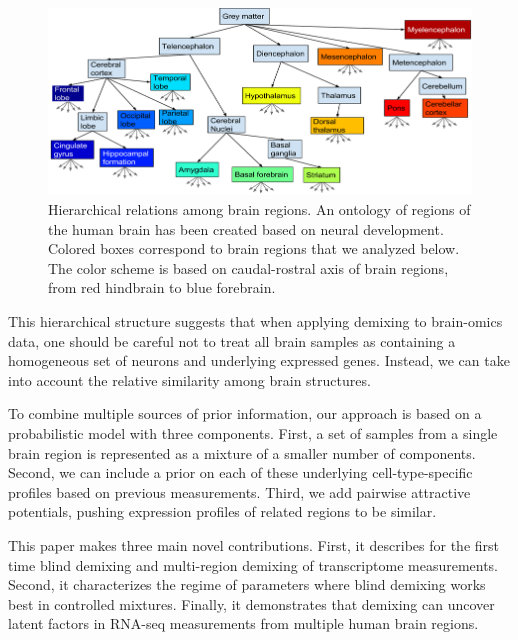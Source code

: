 \documentclass{article} %
\begin{document}
\begin{figure}[!hbt]
  \begin{minipage}[c]{0.63\textwidth}
    \includegraphics[width=\textwidth]{tree}
  \end{minipage}\hfill
  \begin{minipage}[c]{0.35\textwidth}
    \caption{Hierarchical relations among brain regions. An ontology of regions of the human brain has been created based on neural development. Colored boxes correspond to brain regions that we analyzed below. The color scheme is based on caudal-rostral axis of brain regions, from red hindbrain to blue forebrain.} 
    \label{fig:bro}
  \end{minipage}
\end{figure}

This hierarchical structure suggests that when applying demixing to brain-omics data, one should be careful not to treat all brain samples as containing a homogeneous set of neurons and underlying expressed genes. Instead, we can take into account the relative similarity among brain structures. 

To combine multiple sources of prior information, our approach is based on a probabilistic model with three components. First, a set of samples from a single brain region is represented as a mixture of a smaller number of components. Second, we can include a prior on each of these underlying cell-type-specific profiles based on previous measurements. Third, we add pairwise attractive potentials, pushing expression profiles of related regions to be similar.
 
This paper makes three main novel contributions. First, it describes for the first time blind demixing and multi-region demixing of transcriptome measurements. Second, it characterizes the regime of parameters where blind demixing works best in controlled mixtures. Finally, it demonstrates that demixing can uncover latent factors in RNA-seq measurements from multiple human brain regions.
 
\end{document}
